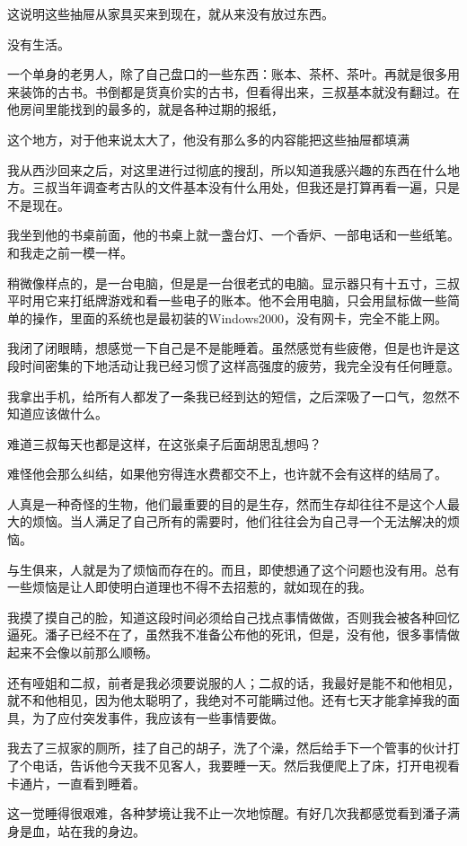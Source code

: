这说明这些抽屉从家具买来到现在，就从来没有放过东西。

没有生活。

一个单身的老男人，除了自己盘口的一些东西：账本、茶杯、茶叶。再就是很多用来装饰的古书。书倒都是货真价实的古书，但看得出来，三叔基本就没有翻过。在他房间里能找到的最多的，就是各种过期的报纸，

这个地方，对于他来说太大了，他没有那么多的内容能把这些抽屉都填满

我从西沙回来之后，对这里进行过彻底的搜刮，所以知道我感兴趣的东西在什么地方。三叔当年调查考古队的文件基本没有什么用处，但我还是打算再看一遍，只是不是现在。

我坐到他的书桌前面，他的书桌上就一盏台灯、一个香炉、一部电话和一些纸笔。和我走之前一模一样。

稍微像样点的，是一台电脑，但是是一台很老式的电脑。显示器只有十五寸，三叔平时用它来打纸牌游戏和看一些电子的账本。他不会用电脑，只会用鼠标做一些简单的操作，里面的系统也是最初装的Windows2000，没有网卡，完全不能上网。

我闭了闭眼睛，想感觉一下自己是不是能睡着。虽然感觉有些疲倦，但是也许是这段时间密集的下地活动让我已经习惯了这样高强度的疲劳，我完全没有任何睡意。

我拿出手机，给所有人都发了一条我已经到达的短信，之后深吸了一口气，忽然不知道应该做什么。

难道三叔每天也都是这样，在这张桌子后面胡思乱想吗？

难怪他会那么纠结，如果他穷得连水费都交不上，也许就不会有这样的结局了。

人真是一种奇怪的生物，他们最重要的目的是生存，然而生存却往往不是这个人最大的烦恼。当人满足了自己所有的需要时，他们往往会为自己寻一个无法解决的烦恼。

与生俱来，人就是为了烦恼而存在的。而且，即使想通了这个问题也没有用。总有一些烦恼是让人即使明白道理也不得不去招惹的，就如现在的我。

我摸了摸自己的脸，知道这段时间必须给自己找点事情做做，否则我会被各种回忆逼死。潘子已经不在了，虽然我不准备公布他的死讯，但是，没有他，很多事情做起来不会像以前那么顺畅。

还有哑姐和二叔，前者是我必须要说服的人；二叔的话，我最好是能不和他相见，就不和他相见，因为他太聪明了，我绝对不可能瞒过他。还有七天才能拿掉我的面具，为了应付突发事件，我应该有一些事情要做。

我去了三叔家的厕所，挂了自己的胡子，洗了个澡，然后给手下一个管事的伙计打了个电话，告诉他今天我不见客人，我要睡一天。然后我便爬上了床，打开电视看卡通片，一直看到睡着。

这一觉睡得很艰难，各种梦境让我不止一次地惊醒。有好几次我都感觉看到潘子满身是血，站在我的身边。

